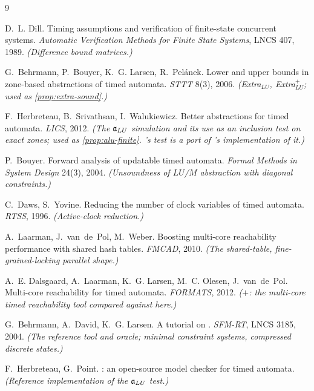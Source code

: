 \begin{thebibliography}{9}

D.~L. Dill.
\newblock Timing assumptions and verification of finite-state concurrent
  systems.
\newblock \emph{Automatic Verification Methods for Finite State Systems}, LNCS
  407, 1989.
\newblock \textit{(Difference bound matrices.)}

G.~Behrmann, P.~Bouyer, K.~G. Larsen, R.~Pel\'anek.
\newblock Lower and upper bounds in zone-based abstractions of timed automata.
\newblock \emph{STTT} 8(3), 2006.
\newblock \textit{(Extra$_{LU}$, Extra$^{+}_{LU}$; used as
  \cref{prop:extra-sound}.)}

F.~Herbreteau, B.~Srivathsan, I.~Walukiewicz.
\newblock Better abstractions for timed automata.
\newblock \emph{LICS}, 2012.
\newblock \textit{(The $\mathfrak{a}_{LU}$ simulation and its use as an inclusion test on
  exact zones; used as \cref{prop:alu-finite}.  \tool{}'s test is a port of
  \tchecker{}'s implementation of it.)}

P.~Bouyer.
\newblock Forward analysis of updatable timed automata.
\newblock \emph{Formal Methods in System Design} 24(3), 2004.
\newblock \textit{(Unsoundness of $LU$/$M$ abstraction with diagonal
  constraints.)}

C.~Daws, S.~Yovine.
\newblock Reducing the number of clock variables of timed automata.
\newblock \emph{RTSS}, 1996.
\newblock \textit{(Active-clock reduction.)}

A.~Laarman, J.~van~de~Pol, M.~Weber.
\newblock Boosting multi-core reachability performance with shared hash tables.
\newblock \emph{FMCAD}, 2010.
\newblock \textit{(The shared-table, fine-grained-locking parallel shape.)}

A.~E. Dalsgaard, A.~Laarman, K.~G. Larsen, M.~C. Olesen, J.~van~de~Pol.
\newblock Multi-core reachability for timed automata.
\newblock \emph{FORMATS}, 2012.
\newblock \textit{(\opaal{}$+$\ltsmin{}: the multi-core timed reachability tool
  compared against here.)}

G.~Behrmann, A.~David, K.~G. Larsen.
\newblock A tutorial on \uppaal{}.
\newblock \emph{SFM-RT}, LNCS 3185, 2004.
\newblock \textit{(The reference tool and oracle; minimal constraint systems,
  compressed discrete states.)}

F.~Herbreteau, G.~Point.
\newblock \tchecker{}: an open-source model checker for timed automata.
\newblock \textit{(Reference implementation of the $\mathfrak{a}_{LU}$ test.)}

\end{thebibliography}
